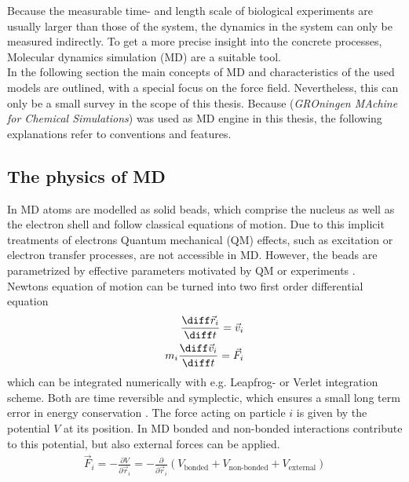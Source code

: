 Because the measurable time- and length scale of biological experiments are usually larger than those of the system, the dynamics in the system can only be measured indirectly. To get a more precise insight into the concrete processes, Molecular dynamics simulation (MD) are a suitable tool.\\
In the following section the main concepts of MD and characteristics of the used models are outlined, with a special focus on the \martini{} force field. Nevertheless, this can only be a small survey in the scope of this thesis. Because \gromacs{} (\textit{GROningen MAchine for Chemical Simulations}) \autocites{gromacs1, gromacsManual} was used as MD engine in this thesis, the following explanations refer to \gromacs{} conventions and features. 
\subsection{The physics of MD}
In MD atoms are modelled as solid beads, which comprise the nucleus as well as the electron shell and follow classical equations of motion. Due to this implicit treatments of electrons Quantum mechanical (QM) effects, such as excitation or electron transfer processes, are not accessible in MD. However, the beads are parametrized by effective parameters motivated by QM or experiments \autocite[p. 127f]{greenBook}.\\
Newtons equation of motion can be turned into two first order differential equation
\begin{align}
	\label{eq:eq_of_mot_first_order}
	\frac{\diff \vec{r}_i}{\diff t} = \vec{v}_i \\
	m_i \frac{\diff \vec{v}_i}{\diff t} = \vec{F}_i
\end{align}
which can be integrated numerically with e.g. Leapfrog- or Verlet integration scheme. Both are time reversible and symplectic, which ensures a small long term error in energy conservation \autocite[p. 72ff]{UnderstandingMD}. The force acting on particle $i$ is given by the potential $V$ at its position. In MD bonded and non-bonded interactions contribute to this potential, but also external forces can be applied.
\begin{align}
	\vec{F}_i = - \frac{\partial V}{\partial \vec{r}_i} = - \frac{\partial}{\partial \vec{r}_i} \left(V_\text{bonded} + V_\text{non-bonded} + V_\text{external}\right)
\end{align}
